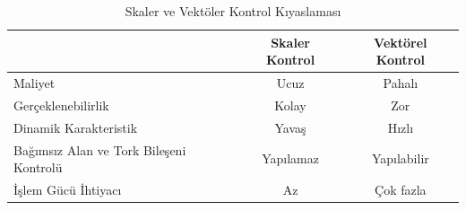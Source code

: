 \documentclass[10pt,a4paper]{article}
\begin{document}
	\begin{center}
		\begin{table}[hb]
		\begin{tabular}{| l | c | c |}
			
			\hline
			 	 & Skaler Kontrol & Vektörel Kontrol \\ \hline
			 Maliyet & Ucuz & Pahalı  \\ \hline
			 Gerçeklenebilirlik & Kolay & Zor \\ \hline
			 Dinamik Karakteristik & Yavaş & Hızlı \\ \hline
			 Bağımsız Alan ve Tork Bileşeni Kontrolü & Yapılamaz & Yapılabilir \\ \hline
			 İşlem Gücü İhtiyacı & Az & Çok fazla \\ \hline
			 
			 
		\end{tabular}
		\caption{Skaler ve Vektöler Kontrol Kıyaslaması}
		\label{tab:scaler_vector_tab}
		\end{table}
	\end{center}
	
\end{document}
